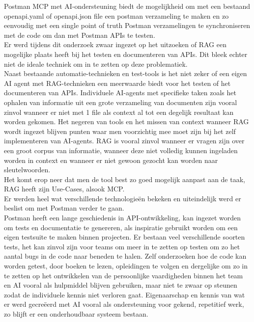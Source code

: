 Postman MCP met AI-ondersteuning biedt de mogelijkheid om met een bestaand openapi.yaml of openapi.json file een postman verzameling te maken en zo eenvoudig met een single point of truth Postman verzamelingen te synchroniseren met de code om dan met Postman APIs te testen. \\

Er werd tijdens dit onderzoek zwaar ingezet op het uitzoeken of RAG een mogelijke plaats heeft bij het testen en documenteren van APIs. Dit bleek echter niet de ideale techniek om in te zetten op deze problematiek.\\

Naast bestaande automatie-technieken en test-tools is het niet zeker of een eigen AI agent met RAG-technieken een meerwaarde biedt voor het testen of het documenteren van APIs. Individuele AI-agents met specifieke taken zoals het ophalen van informatie uit een grote verzameling van documenten zijn vooral zinvol wanneer er niet met 1 file als context al tot een degelijk resultaat kan worden gekomen. Het negeren van tools en het missen van context wanneer RAG wordt ingezet blijven punten waar men voorzichtig mee moet zijn bij het zelf implementeren van AI-agents. RAG is vooral zinvol wanneer er vragen zijn over een groot corpus van informatie, wanneer deze niet volledig kunnen ingeladen worden in context en wanneer er niet gewoon gezocht kan worden naar sleutelwoorden. \\

Het komt erop neer dat men de tool best zo goed mogelijk aanpast aan de taak, RAG heeft zijn Use-Cases, alsook MCP. \\

Er werden heel wat verschillende technologieën bekeken en uiteindelijk werd er beslist om met Postman verder te gaan.\\

Postman heeft een lange geschiedenis in API-ontwikkeling, kan ingezet worden om tests en documentatie te genereren, als inspiratie gebruikt worden om een eigen testsuite te maken binnen projecten. Er bestaan veel verschillende soorten tests, het kan zinvol zijn voor teams om meer in te zetten op testen om zo het aantal bugs in de code naar beneden te halen. Zelf onderzoeken hoe de code kan worden getest, door boeken te lezen, opleidingen te volgen en dergelijke om zo in te zetten op het ontwikkelen van de persoonlijke vaardigheden binnen het team en AI vooral als hulpmiddel blijven gebruiken, maar niet te zwaar op steunen zodat de individuele kennis niet verloren gaat. Eigenaarschap en kennis van wat er werd gecreëerd met AI vooral als ondersteuning voor gekend, repetitief werk, zo blijft er een onderhoudbaar systeem bestaan.


